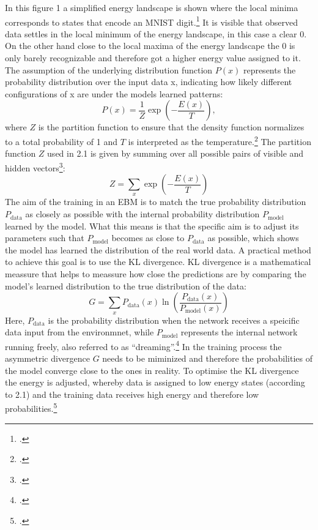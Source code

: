 In this figure 1 a simplified energy landscape is shown where the local minima corresponds to states that encode an MNIST digit.\footcite[cf.][6]{huembeliPhysicsEnergybasedModels2022} It is visible that observed data settles in the local minimum of the energy landscape, in this case a clear 0. On the other hand close to the local maxima of the energy landscape the 0 is only barely recognizable and therefore got a higher energy value assigned to it.
The assumption of the underlying distribution function \( P(x) \) represents the probability distribution over the input data x,
indicating how likely different configurations of x are under the models learned patterns:
\begin{equation}
    P(x) = \frac{1}{Z} \exp\left(-\frac{E(x)}{T}\right),
\end{equation}
where \( Z \) is the partition function to ensure
that the density function normalizes to a total probability of 1 and \( T \) is interpreted as the temperature.\footcite[cf.][2-3]{huembeliPhysicsEnergybasedModels2022}
The partition function \( Z \) used in 2.1 is given by summing over all possible pairs of visible and hidden vectors\footcite[cf.][4]{hintonPracticalGuideTraining2012}:
\begin{equation}
    Z = \sum_x \exp\left(-\frac{E(x)}{T}\right)
\end{equation}
The aim of the training in an \ac{EBM} is to match the true probability distribution \( P_{\text{data}} \) as closely as possible with the internal probability distribution \( P_{\text{model}} \) learned by the model.
What this means is that the specific aim is to adjust its parameters such that \( P_{\text{model}} \)
becomes as close to \( P_{\text{data}} \) as possible, which shows the model has learned the distribution of the real world data.
A practical method to achieve this goal is to use the KL divergence. KL divergence is a mathematical meassure that helps to meassure how close the predictions are by comparing the model's learned distribution to the true distribution of the data:
\begin{equation}
    G = \sum_x P_{\text{data}}(x) \ln \left( \frac{P_{\text{data}}(x)}{P_{\text{model}}(x)} \right)
\end{equation}
Here, \( P_{\text{data}} \) is the probability distribution when the network receives a speicific data input from the environmnet, while \( P_{\text{model}} \) represents the internal network running freely, also referred to as ``dreaming''.\footcite[cf.][154-155]{ackleyLearningAlgorithmBoltzmann1985}
In the training process the asymmetric divergence \( G \) needs to be miminized and therefore the probabilities of the model converge close to the ones in reality.
To optimise the KL divergence the energy is adjusted, whereby data is assigned to low energy states (according to 2.1) and the training data receives high energy and therefore low probabilities.\footcite[cf.][2-3]{zhaiDeepStructuredEnergy2016}

